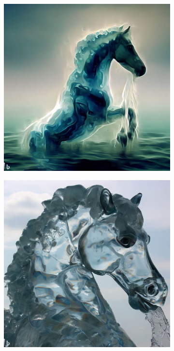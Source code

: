 \documentclass[11pt, twoside]{article}
\begin{document}
\begin{figure}[H]
\centering
\caption{Wasserpferd}
\label{fig:wasserpferd}
  \begin{subfigure}{0.3\textwidth}
    \centering
    \includegraphics[width=0.99\linewidth]{wasserpferd1.jpeg}
  \end{subfigure}%
  \begin{subfigure}{0.3\textwidth}
    \centering
    \includegraphics[width=0.99\linewidth]{wasserpferd2.jpeg}

\end{subfigure}
\end{figure}
\end{document}
